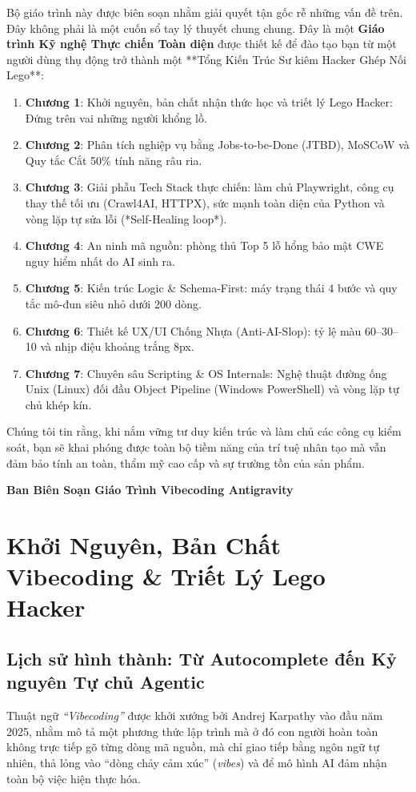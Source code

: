 \documentclass[a4paper,11pt]{report}
\begin{document}
Bộ giáo trình này được biên soạn nhằm giải quyết tận gốc rễ những vấn đề trên. Đây không phải là một cuốn sổ tay lý thuyết chung chung. Đây là một \textbf{Giáo trình Kỹ nghệ Thực chiến Toàn diện} được thiết kế để đào tạo bạn từ một người dùng thụ động trở thành một **Tổng Kiến Trúc Sư kiêm Hacker Ghép Nối Lego**:
\begin{enumerate}[label={\arabic*.}]
    \item \textbf{Chương 1}: Khởi nguyên, bản chất nhận thức học và triết lý Lego Hacker: Đứng trên vai những người khổng lồ.
    \item \textbf{Chương 2}: Phân tích nghiệp vụ bằng Jobs-to-be-Done (JTBD), MoSCoW và Quy tắc Cắt 50\% tính năng râu ria.
    \item \textbf{Chương 3}: Giải phẫu Tech Stack thực chiến: làm chủ Playwright, công cụ thay thế tối ưu (Crawl4AI, HTTPX), sức mạnh toàn diện của Python và vòng lặp tự sửa lỗi (*Self-Healing loop*).
    \item \textbf{Chương 4}: An ninh mã nguồn: phòng thủ Top 5 lỗ hổng bảo mật CWE nguy hiểm nhất do AI sinh ra.
    \item \textbf{Chương 5}: Kiến trúc Logic \& Schema-First: máy trạng thái 4 bước và quy tắc mô-đun siêu nhỏ dưới 200 dòng.
    \item \textbf{Chương 6}: Thiết kế UX/UI Chống Nhựa (Anti-AI-Slop): tỷ lệ màu 60--30--10 và nhịp điệu khoảng trắng 8px.
    \item \textbf{Chương 7}: Chuyên sâu Scripting \& OS Internals: Nghệ thuật đường ống Unix (Linux) đối đầu Object Pipeline (Windows PowerShell) và vòng lặp tự chủ khép kín.
\end{enumerate}

Chúng tôi tin rằng, khi nắm vững tư duy kiến trúc và làm chủ các công cụ kiểm soát, bạn sẽ khai phóng được toàn bộ tiềm năng của trí tuệ nhân tạo mà vẫn đảm bảo tính an toàn, thẩm mỹ cao cấp và sự trường tồn của sản phẩm.

\vspace{1.5em}
\noindent\textbf{Ban Biên Soạn Giáo Trình Vibecoding Antigravity}

\tableofcontents

\chapter{Khởi Nguyên, Bản Chất Vibecoding \& Triết Lý Lego Hacker}

\section{Lịch sử hình thành: Từ Autocomplete đến Kỷ nguyên Tự chủ Agentic}
Thuật ngữ \textit{``Vibecoding''} được khởi xướng bởi Andrej Karpathy vào đầu năm 2025, nhằm mô tả một phương thức lập trình mà ở đó con người hoàn toàn không trực tiếp gõ từng dòng mã nguồn, mà chỉ giao tiếp bằng ngôn ngữ tự nhiên, thả lỏng vào ``dòng chảy cảm xúc'' (\textit{vibes}) và để mô hình AI đảm nhận toàn bộ việc hiện thực hóa.
\end{document}

